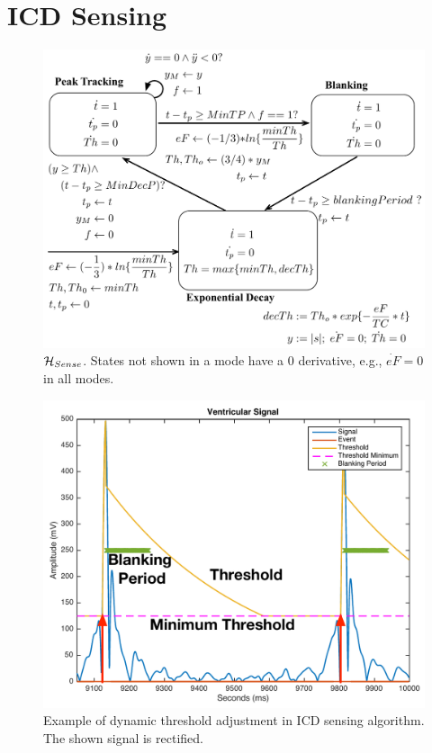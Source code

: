\section{ICD Sensing}
\label{sec:sensing}
\begin{figure}[t]
	\centering
	\includegraphics[scale=0.35]{figures/sensingModel}
	\vspace{-10pt}
	\caption{\small $\mathcal{H}_{Sense}$. States not shown in a mode have a 0 derivative, e.g., $\dot{eF}=0$ in all modes.}
	\vspace{-10pt}
	\label{fig:sensingModel}
\end{figure}
\begin{figure}[t]
	\centering
	\includegraphics[scale=0.3]{figures/sensingExample}
	\vspace{-10pt}
	\caption{\small Example of dynamic threshold adjustment in ICD sensing algorithm. The shown signal is rectified.}
	\vspace{-10pt}
	\label{fig:sensingExample}
\end{figure}

